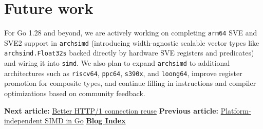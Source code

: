 \documentclass[11pt,a4paper]{article}
\begin{document}
\section{Future work}

For Go 1.28 and beyond, we are actively working on completing \texttt{arm64} SVE and SVE2 support in \texttt{archsimd} (introducing width-agnostic scalable vector types like \texttt{archsimd.Float32s} backed directly by hardware SVE registers and predicates) and wiring it into \texttt{simd}. We also plan to expand \texttt{archsimd} to additional architectures such as \texttt{riscv64}, \texttt{ppc64}, \texttt{s390x}, and \texttt{loong64}, improve register promotion for composite types, and continue filling in instructions and compiler optimizations based on community feedback.

\textbf{Next article:} \href{https://go.dev/blog/http-connection-reuse}{Better HTTP/1 connection reuse} \textbf{Previous article:} \href{https://go.dev/blog/simd-experiment}{Platform-independent SIMD in Go} \href{https://go.dev/blog/all}{\textbf{Blog Index}}
\end{document}

